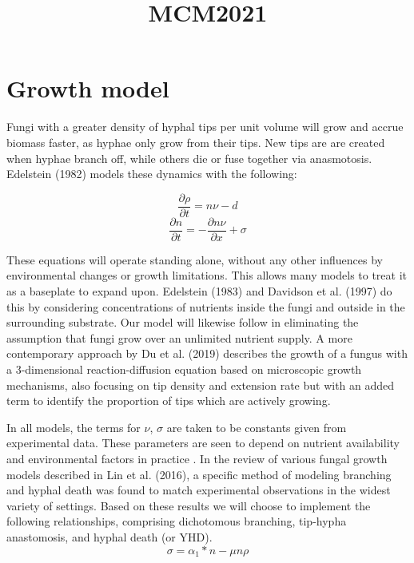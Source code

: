 \documentclass[10pt]{article}
\title{MCM2021}
\begin{document}
\maketitle

\section*{Growth model}
Fungi with a greater density of hyphal tips per unit volume will grow and accrue biomass faster, as hyphae only grow from their tips. New tips are are created when hyphae branch off, while others die or fuse together via anasmotosis. Edelstein (1982) models these dynamics with the following:

\begin{equation} \label {eq}
    \frac{\partial \rho}{\partial t} = n\nu - d
\end{equation}
\begin{equation} \label {eq}
    \frac{\partial n}{\partial t} = -\frac{\partial n\nu}{\partial x} + \sigma
\end{equation}


These equations will operate standing alone, without any other influences by environmental changes or growth limitations. This allows many models to treat it as a baseplate to expand upon. Edelstein (1983) and Davidson et al. (1997) do this by considering concentrations of nutrients inside the fungi and outside in the surrounding substrate. Our model will likewise follow in eliminating the assumption that fungi grow over an unlimited nutrient supply. A more contemporary approach by Du et al. (2019) describes the growth of a fungus with a 3-dimensional reaction-diffusion equation based on microscopic growth mechanisms, also focusing on tip density and extension rate but with an added term to identify the proportion of tips which are actively growing.

In all models, the terms for $\nu$, $\sigma$ are taken to be constants given from experimental data. These parameters are seen to depend on nutrient availability and environmental factors in practice \cite{Edelstein1982}. In the review of various fungal growth models described in Lin et al. (2016), a specific method of modeling branching and hyphal death was found to match experimental observations in the widest variety of settings. Based on these results we will choose to implement the following relationships, comprising dichotomous branching, tip-hypha anastomosis, and hyphal death (or YHD). 
\begin{equation} \label {eq}
    \sigma = \alpha_{1}*n - \mu n \rho
\end{equation}
\end{document}
